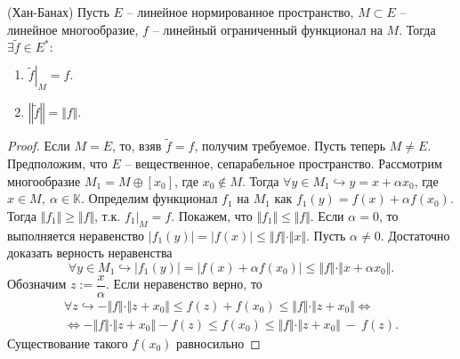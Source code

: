 \begin{theorem}
    (Хан-Банах) Пусть $\displaystyle E$ -- линейное нормированное пространство, $\displaystyle M\subset E$ -- линейное многообразие, $\displaystyle f$ -- линейный ограниченный функционал на $\displaystyle M$. Тогда $\displaystyle \exists \tilde{f} \in E^{*} :$
    \begin{enumerate}
        \item $\displaystyle \left.\tilde{f} \right\vert_{M} =f$.
        \item $\displaystyle \left\Vert \tilde{f}\right\Vert =\Vert f\Vert $.
    \end{enumerate}
    \end{theorem}
    \begin{proof}
    Если $\displaystyle M=E$, то, взяв $\displaystyle \tilde{f} =f$, получим требуемое. Пусть теперь $\displaystyle M\neq E$. Предположим, что $\displaystyle E$ -- вещественное, сепарабельное пространство. Рассмотрим многообразие $\displaystyle M_{1} =M\oplus [ x_{0}]$, где $\displaystyle x_{0} \notin M$. Тогда $\displaystyle \forall y\in M_{1} \hookrightarrow y=x+\alpha x_{0}$, где $\displaystyle x\in M,\ \alpha \in \mathbb{K}$. Определим функционал $\displaystyle f_{1}$ на $\displaystyle M_{1}$ как $\displaystyle f_{1}( y) =f( x) +\alpha f( x_{0})$. Тогда $\displaystyle \Vert f_{1}\Vert \geqslant \Vert f\Vert $, т.к. $\displaystyle f_{1} |_{M} =f$. Покажем, что $\displaystyle \Vert f_{1}\Vert \leqslant \Vert f\Vert $. Если $\displaystyle \alpha =0$, то выполняется неравенство $\displaystyle | f_{1}( y)| =| f( x)| \leqslant \Vert f\Vert \cdotp \Vert x\Vert $. Пусть $\displaystyle \alpha \neq 0$. Достаточно доказать верность неравенства
    \begin{equation*}
    \forall y\in M_{1} \hookrightarrow | f_{1}( y)| =| f( x) +\alpha f( x_{0})| \leqslant \Vert f\Vert \cdotp \Vert x+\alpha x_{0}\Vert .
    \end{equation*}
    Обозначим $\displaystyle z:=\dfrac{x}{\alpha }$. Если неравенство верно, то
    \begin{gather*}
    \forall z\hookrightarrow -\Vert f\Vert \cdotp \Vert z+x_{0}\Vert \leqslant f( z) +f( x_{0}) \leqslant \Vert f\Vert \cdotp \Vert z+x_{0}\Vert \Leftrightarrow \\
    \Leftrightarrow -\Vert f\Vert \cdotp \Vert z+x_{0}\Vert -f( z) \leqslant f( x_{0}) \leqslant \Vert f\Vert \cdotp \Vert z+x_{0}\Vert \ -\ f( z) .
    \end{gather*}
    Существование такого $\displaystyle f( x_{0})$ равносильно

\end{proof}
